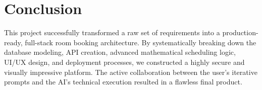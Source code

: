 \documentclass[12pt, a4paper]{report}
\begin{document}
\chapter{Conclusion}
This project successfully transformed a raw set of requirements into a production-ready, full-stack room booking architecture. By systematically breaking down the database modeling, API creation, advanced mathematical scheduling logic, UI/UX design, and deployment processes, we constructed a highly secure and visually impressive platform. The active collaboration between the user's iterative prompts and the AI's technical execution resulted in a flawless final product.
\end{document}
